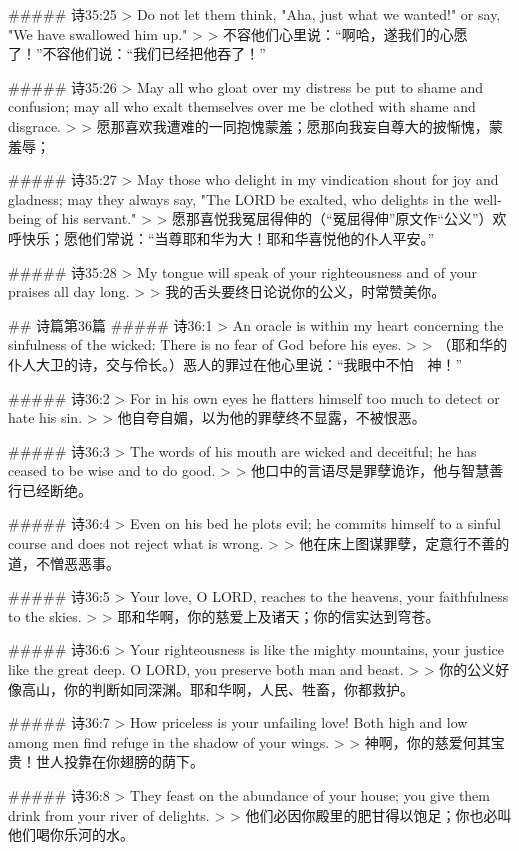 ##### 诗35:25
> Do not let them think, "Aha, just what we wanted!" or say, "We have swallowed him up."
>
> 不容他们心里说：“啊哈，遂我们的心愿了！”不容他们说：“我们已经把他吞了！”


##### 诗35:26
> May all who gloat over my distress be put to shame and confusion; may all who exalt themselves over me be clothed with shame and disgrace.
>
> 愿那喜欢我遭难的一同抱愧蒙羞；愿那向我妄自尊大的披惭愧，蒙羞辱；


##### 诗35:27
> May those who delight in my vindication shout for joy and gladness; may they always say, "The LORD be exalted, who delights in the well-being of his servant."
>
> 愿那喜悦我冤屈得伸的（“冤屈得伸”原文作“公义”）欢呼快乐；愿他们常说：“当尊耶和华为大！耶和华喜悦他的仆人平安。”


##### 诗35:28
> My tongue will speak of your righteousness and of your praises all day long.
>
> 我的舌头要终日论说你的公义，时常赞美你。


## 诗篇第36篇
##### 诗36:1
> An oracle is within my heart concerning the sinfulness of the wicked: There is no fear of God before his eyes.
>
> （耶和华的仆人大卫的诗，交与伶长。）恶人的罪过在他心里说：“我眼中不怕　神！”


##### 诗36:2
> For in his own eyes he flatters himself too much to detect or hate his sin.
>
> 他自夸自媚，以为他的罪孽终不显露，不被恨恶。


##### 诗36:3
> The words of his mouth are wicked and deceitful; he has ceased to be wise and to do good.
>
> 他口中的言语尽是罪孽诡诈，他与智慧善行已经断绝。


##### 诗36:4
> Even on his bed he plots evil; he commits himself to a sinful course and does not reject what is wrong.
>
> 他在床上图谋罪孽，定意行不善的道，不憎恶恶事。


##### 诗36:5
> Your love, O LORD, reaches to the heavens, your faithfulness to the skies.
>
> 耶和华啊，你的慈爱上及诸天；你的信实达到穹苍。


##### 诗36:6
> Your righteousness is like the mighty mountains, your justice like the great deep. O LORD, you preserve both man and beast.
>
> 你的公义好像高山，你的判断如同深渊。耶和华啊，人民、牲畜，你都救护。


##### 诗36:7
> How priceless is your unfailing love! Both high and low among men find refuge in the shadow of your wings.
>
> 神啊，你的慈爱何其宝贵！世人投靠在你翅膀的荫下。


##### 诗36:8
> They feast on the abundance of your house; you give them drink from your river of delights.
>
> 他们必因你殿里的肥甘得以饱足；你也必叫他们喝你乐河的水。


